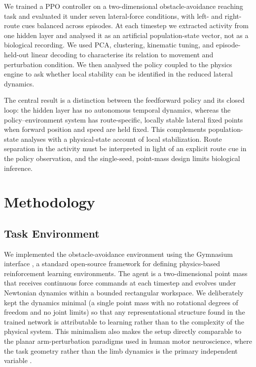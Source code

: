 \documentclass{article}
\begin{document}
We trained a PPO controller on a two-dimensional obstacle-avoidance reaching
task and evaluated it under seven lateral-force conditions, with left- and
right-route cues balanced across episodes. At each timestep we extracted
activity from one hidden layer and analysed it as an artificial
population-state vector, not as a biological recording. We used PCA,
clustering, kinematic tuning, and episode-held-out linear decoding to
characterise its relation to movement and perturbation condition. We then
analysed the policy coupled to the physics engine to ask whether local
stability can be identified in the reduced lateral dynamics.

The central result is a distinction between the feedforward policy and its
closed loop: the hidden layer has no autonomous temporal dynamics, whereas
the policy--environment system has route-specific, locally stable lateral
fixed points when forward position and speed are held fixed. This
complements population-state analyses with a physical-state account of local
stabilization. Route separation in the activity must be interpreted in light
of an explicit route cue in the policy observation, and the single-seed,
point-mass design limits biological inference.


\section{Methodology}

\subsection{Task Environment}

We implemented the obstacle-avoidance environment using the Gymnasium
interface \citep{Towers2024Gymnasium}, a standard open-source framework
for defining physics-based reinforcement learning environments.
The agent is a two-dimensional point mass that receives continuous force
commands at each timestep and evolves under Newtonian dynamics within a
bounded rectangular workspace.
We deliberately kept the dynamics minimal (a single point mass with no
rotational degrees of freedom and no joint limits) so that any
representational structure found in the trained network is attributable
to learning rather than to the complexity of the physical system.
This minimalism also makes the setup directly comparable to the planar
arm-perturbation paradigms used in human motor neuroscience, where the
task geometry rather than the limb dynamics is the primary independent
variable \citep{Nashed2014,Pruszynski2012,Shadmehr1994,Franklin2011}.
\end{document}
